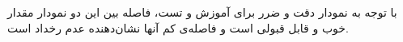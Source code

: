 \documentclass[12pt]{article}
\begin{document}
	\begin{figure}[H]
		\centering
	\end{figure}
	با توجه به نمودار دقت و ضرر برای آموزش و تست، فاصله بین این دو نمودار مقدار خوب و قابل قبولی است و فاصله‌ی کم آنها نشان‌دهنده عدم رخداد  است.
	
\end{document}
